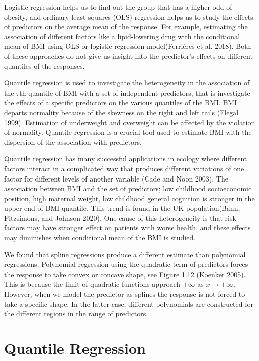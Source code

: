 \documentclass[
  12pt,
]{article}
\begin{document}
Logistic regression helps us to find out the group that has a higher odd of obesity, and ordinary least squares (OLS) regression helps us to study the effects of predictors on the average mean of the response. For example, estimating the association of different factors like a lipid-lowering drug with the conditional mean of BMI using OLS or logistic regression model(Ferrières et al. 2018). Both of these approaches do not give us insight into the predictor's effects on different quantiles of the responses.

Quantile regression is used to investigate the heterogeneity in the association of the \(\tau\)th quantile of BMI with a set of independent predictors, that is investigate the effects of a specific predictors on the various quantiles of the BMI. BMI departs normality because of the skewness on the right and left tails (Flegal 1999). Estimation of underweight and overweight can be affected by the violation of normality. Quantile regression is a crucial tool used to estimate BMI with the dispersion of the association with predictors.

Quantile regression has many successful applications in ecology where different factors interact in a complicated way that produces different variations of one factor for different levels of another variable (Cade and Noon 2003). The association between BMI and the set of predictors; low childhood socioeconomic position, high maternal weight, low childhood general cognition is stronger in the upper end of BMI quantile. This trend is found in the UK population(Bann, Fitzsimons, and Johnson 2020). One cause of this heterogeneity is that risk factors may have stronger effect on patients with worse health, and these effects may diminishes when conditional mean of the BMI is studied.

We found that spline regressions produce a different estimate than polynomial regressions. Polynomial regression using the quadratic term of predictors forces the response to take convex or concave shape, see Figure 1.12 (Koenker 2005). This is because the limit of quadratic functions approach \(\pm\infty\) as \(x\rightarrow\pm\infty.\) However, when we model the predictor as splines the response is not forced to take a specific shape. In the latter case, different polynomials are constructed for the different regions in the range of predictors.

\section{Quantile Regression}
\end{document}
